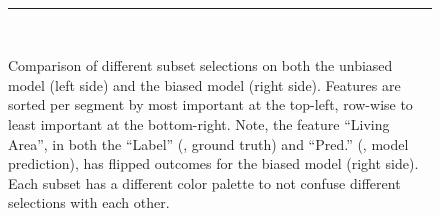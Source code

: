 \begin{figure}[t]
~\\
\noindent\rule{\linewidth}{0.4pt}
~\\
\caption[Comparison of different subset selections on both models.]{
Comparison of different subset selections on both the unbiased model (left side) and the biased model (right side).
Features are sorted per segment by most important at the top-left, row-wise to least important at the bottom-right.
Note, the feature ``Living Area'', in both the ``Label'' (\ie, ground truth) and ``Pred.'' (\ie, model prediction), has flipped outcomes for the biased model (right side).
Each subset has a different color palette to not confuse different selections with each other.
}
\label{figs:good_vs_bad}
\end{figure}

